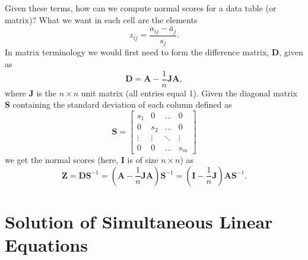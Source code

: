 Given these terms, how can we compute normal scores for a data table (or matrix)?  What we want in 
each cell are the elements
\begin{equation}
z_{ij} = \frac{a_{ij} - \bar{a}_j}{s_j}.
\end{equation} 
In matrix terminology we would first need to form the difference matrix, $\mathbf{D}$, given as
\begin{equation}
\mathbf{D = A} - \frac{1}{n}\mathbf{JA},
\end{equation}
where $\mathbf{J}$ is the $n \times n$ unit matrix (all entries equal 1).
Given the diagonal matrix $\mathbf{S}$ containing the standard deviation of each column defined as
\begin{equation}
\mathbf{S} = 
\left [ \begin{array}{cccc}
s_1 & 0 & \ldots & 0 \\
0 & s_2 & \ldots & 0 \\
\vdots & \vdots &  \ddots  & \vdots\\
0 & 0 & \ldots & s_m
\end{array} \right]
\end{equation}
we get the normal scores (here, $\mathbf{I}$ is of size $n \times n$) as
\begin{equation}
\mathbf{Z = DS}^{-1} = \left ( \mathbf{A} - \frac{1}{n} \mathbf{JA} \right) \mathbf{S}^{-1} = \left ( \mathbf{I} - \frac{1}{n} \mathbf{J} \right)
\mathbf{AS}^{-1}.
\end{equation}

\section{Solution of Simultaneous Linear Equations}

